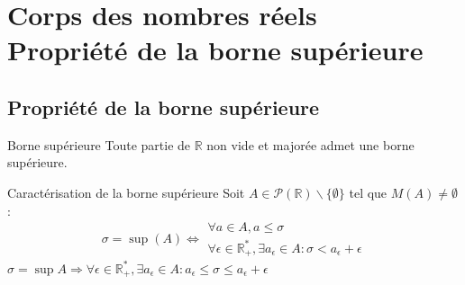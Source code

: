 \chapter{Corps des nombres réels\\Propriété de la borne supérieure}

\section{Propriété de la borne supérieure}
\begin{theorem}{Borne supérieure}
Toute partie de $\mathbb{R}$ non vide et majorée admet une borne supérieure.
\end{theorem}

\begin{propriete}{Caractérisation de la borne supérieure}
    Soit $A\in\mathcal{P}(\mathbb{R})\backslash\{\emptyset\}$ tel que $M(A)\neq\emptyset$ :
    \[ \sigma = \sup(A) \Leftrightarrow\begin{array}{|l}\forall a\in A, a\leq\sigma \\
\forall\epsilon\in\mathbb{R}_+^*,\exists a_\epsilon\in A:\sigma<a_\epsilon+\epsilon \end{array} \]
\remarque $\sigma = \sup A \Rightarrow \forall\epsilon\in\mathbb{R}_+^*, \exists a_\epsilon\in A:a_\epsilon\leq\sigma\leq a_\epsilon + \epsilon$
\end{propriete}

